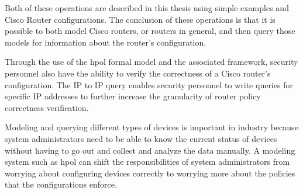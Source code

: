\documentclass[12pt,letterpaper]{report}
\begin{document}
Both of these operations are described in this thesis using simple examples and Cisco Router configurations. The conclusion of these operations is that it is possible to both model Cisco routers, or routers in general, and then query those models for information about the router's configuration.

Through the use of the \ac{hpol} formal model and the associated framework, security personnel also have the ability to verify the correctness of a Cisco router's configuration. The IP to IP query enables security personnel to write queries for specific IP addresses to further increase the granularity of router policy correctness verification.

Modeling and querying different types of devices is important in industry because system administrators need to be able to know the current status of devices without having to go out and collect and analyze the data manually. A modeling system such as \ac{hpol} can shift the responsibilities of system administrators from worrying about configuring devices correctly to worrying more about the policies that the configurations enforce.


\pagebreak


\renewcommand\bibname{References}



%

\end{document}
